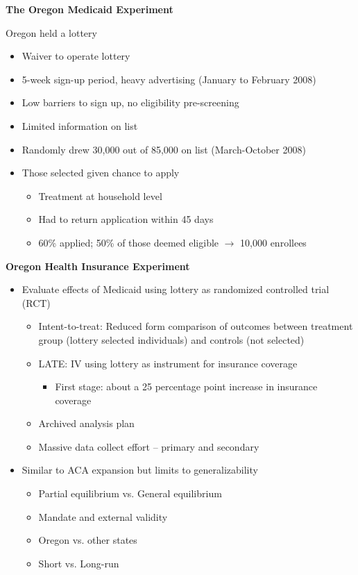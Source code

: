 \documentclass[notes=show]{beamer}
\begin{document}
\begin{frame}[plain]
	\begin{center}
	\textbf{The Oregon Medicaid Experiment}
	\end{center}
	
Oregon held a lottery
		\begin{itemize}
		\item Waiver to operate lottery
		\item 5-week sign-up period, heavy advertising (January to February 2008)
		\item Low barriers to sign up, no eligibility pre-screening
		\item Limited information on list
		\item Randomly drew 30,000 out of 85,000 on list (March-October 2008)
		\item Those selected given chance to apply
			\begin{itemize}
			\item Treatment at household level
			\item Had to return application within 45 days
			\item 60\% applied; 50\% of those deemed eligible $\rightarrow$ 10,000 enrollees 
			\end{itemize}
		\end{itemize}
\end{frame}

\begin{frame}[plain]
	\begin{center}
	\textbf{Oregon Health Insurance Experiment}
	\end{center}
	
	\begin{itemize}
	\item Evaluate effects of Medicaid using lottery as randomized controlled trial (RCT)
		\begin{itemize}
		\item Intent-to-treat: Reduced form comparison of outcomes between treatment group (lottery selected individuals) and controls (not selected)
		\item LATE: IV using lottery as instrument for insurance coverage
			\begin{itemize}
			\item First stage: about a 25 percentage point increase in insurance coverage
			\end{itemize}
		\item Archived analysis plan
		\item Massive data collect effort -- primary and secondary
		\end{itemize}
	\item Similar to ACA expansion but limits to generalizability
		\begin{itemize}
		\item Partial equilibrium vs. General equilibrium
		\item Mandate and external validity
		\item Oregon vs. other states
		\item Short vs. Long-run
		\end{itemize}
	\end{itemize}
\end{frame}
		
\end{document}
